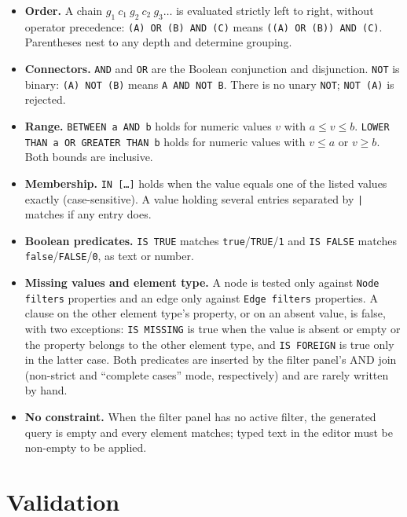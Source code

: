 \documentclass[10pt]{article}
\begin{document}
\begin{itemize}
  \item \textbf{Order.} A chain $g_1\ c_1\ g_2\ c_2\ g_3 \ldots$ is evaluated
    strictly left to right, without operator precedence:
    \texttt{(A) OR (B) AND (C)} means \texttt{((A) OR (B)) AND (C)}.
    Parentheses nest to any depth and determine grouping.
  \item \textbf{Connectors.} \texttt{AND} and \texttt{OR} are the Boolean
    conjunction and disjunction. \texttt{NOT} is binary:
    \texttt{(A) NOT (B)} means \texttt{A AND NOT B}. There is no unary
    \texttt{NOT}; \texttt{NOT (A)} is rejected.
  \item \textbf{Range.} \texttt{BETWEEN a AND b} holds for numeric values $v$
    with $a \le v \le b$. \texttt{LOWER THAN a OR GREATER THAN b} holds for
    numeric values with $v \le a$ or $v \ge b$. Both bounds are inclusive.
  \item \textbf{Membership.} \texttt{IN [\ldots]} holds when the value equals
    one of the listed values exactly (case-sensitive). A value holding several
    entries separated by \texttt{|} matches if any entry does.
  \item \textbf{Boolean predicates.} \texttt{IS TRUE} matches
    \texttt{true}/\texttt{TRUE}/\texttt{1} and \texttt{IS FALSE} matches
    \texttt{false}/\texttt{FALSE}/\texttt{0}, as text or number.
  \item \textbf{Missing values and element type.} A node is tested only
    against \texttt{Node filters} properties and an edge only against
    \texttt{Edge filters} properties. A clause on the other element type's
    property, or on an absent value, is false, with two exceptions:
    \texttt{IS MISSING} is true when the value is absent or empty or the
    property belongs to the other element type, and \texttt{IS FOREIGN} is true
    only in the latter case. Both predicates are inserted by the filter panel's
    AND join (non-strict and ``complete cases'' mode, respectively) and are
    rarely written by hand.
  \item \textbf{No constraint.} When the filter panel has no active filter,
    the generated query is empty and every element matches; typed text in the
    editor must be non-empty to be applied.
\end{itemize}

\section*{Validation}
\end{document}
